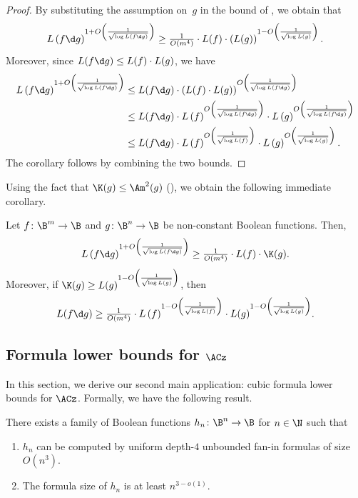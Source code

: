 \documentclass{toc}
\begin{document}
\begin{proof}
By substituting the assumption on~$g$ in the bound of ,
we obtain that 
\[
L\left(f\d g\right)^{1+O\left(\frac{1}{\sqrt{\log L(f\d g)}}\right)}\geq\tfrac{1}{O(m^{4})}\cdot L(f) \cdot\left(L(g)\right)^{1-O\left(\frac{1}{\sqrt{\log L(g)}}\right)}.
\]
Moreover, since $L(f\d g)\le L(f)\cdot L(g)$, we have 
\begin{align*}
L\left(f\d g\right)^{1+O\left(\frac{1}{\sqrt{\log L(f\d g)}}\right)} & \le L(f\d g)\cdot\left(L(f)\cdot L(g)\right)^{O\left(\frac{1}{\sqrt{\log L(f\d g)}}\right)}\\
 & \le L(f\d g)\cdot L\left(f\right)^{O\left(\frac{1}{\sqrt{\log L(f\d g)}}\right)}\cdot L\left(g\right)^{O\left(\frac{1}{\sqrt{\log L(f\d g)}}\right)}\\
 & \le L(f\d g)\cdot L\left(f\right)^{O\left(\frac{1}{\sqrt{\log L(f)}}\right)}\cdot L\left(g\right)^{O\left(\frac{1}{\sqrt{\log L(g)}}\right)}.
\end{align*}
The corollary follows by combining the two bounds. 
\end{proof}
Using the fact that $\K(g)\le\Am^{2}(g)$ (), we obtain
the following immediate corollary. 
\begin{corollary}
\label{cor:KRW-original-khrapchenko}Let $f\colon\B^{m}\to\B$ and $g\colon\B^{n}\to\B$
be non-constant Boolean functions. Then, 
\[
L\left(f\d g\right)^{1+O\left(\frac{1}{\sqrt{\log L(f\d g)}}\right)}\geq\tfrac{1}{O(m^{4})}\cdot L(f) \cdot\K(g).
\]
Moreover, if $\K(g)\ge L(g)^{1-O\left(\frac{1}{\sqrt{\log L(g)}}\right)}$,
then 
\[
L(f\d g)\ge\tfrac{1}{O(m^{4})}\cdot L\left(f\right)^{1-O\left(\frac{1}{\sqrt{\log L(f)}}\right)}\cdot L(g)^{1-O\left(\frac{1}{\sqrt{\log L(g)}}\right)}.
\]
\end{corollary}


\subsection{\label{subsec:AC0-bounds}Formula lower bounds for \texorpdfstring{$\protect\ACz$}{AC0}}

In this section, we derive our second main application: cubic formula
lower bounds for $\ACz$. Formally, we have the following result.
\begin{restated}{}
There exists a family of Boolean functions $h_{n}\colon\B^{n}\to\B$ for
$n\in\N$ such that 
\begin{enumerate}
\item $h_{n}$ can be computed by uniform depth-$4$ unbounded fan-in formulas
of size $O(n^{3})$. 
\item The formula size of $h_{n}$ is at least $n^{3-o(1)}$.
\end{enumerate}
\end{restated}
\end{document}
